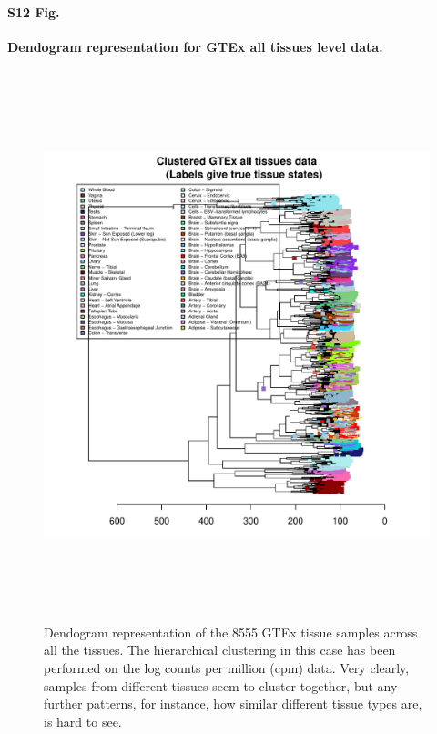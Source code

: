 \documentclass[10pt,letterpaper]{article}
\begin{document}
\paragraph*{S12 Fig.}

\label{figS12}
{\bf Dendogram representation for GTEx all tissues level data.}
\begin{figure}[ht]
\centering
\includegraphics[height=6.3in, width=6in]{../../plots/dendextend_gtex.pdf}
\caption{Dendogram representation of the 8555 GTEx tissue samples across all the tissues. 
The hierarchical clustering in this case has been performed on the log counts per million (cpm) data.
Very clearly, samples from different tissues seem to cluster together, but any further patterns, for instance, how similar different tissue types are, is hard to see.}
\end{figure}
\end{document}
